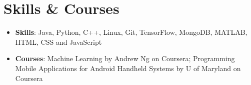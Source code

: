 \documentclass[letterpaper,11pt]{article}
\newcommand{\resumeSubHeadingListStart}{\begin{itemize}[leftmargin=*]}
\newcommand{\resumeSubHeadingListEnd}{\end{itemize}}
\begin{document}
\section{Skills \& Courses}
  \resumeSubHeadingListStart
    \item{
      \textbf{Skills}{: Java, Python, C++, Linux, Git, TensorFlow, MongoDB, MATLAB, HTML, CSS and JavaScript}}
      \item{
      \textbf{Courses}{: Machine Learning by Andrew Ng on Coursera; Programming Mobile Applications for Android Handheld Systems by U of Maryland on Coursera}
    }
  \resumeSubHeadingListEnd

\end{document}
